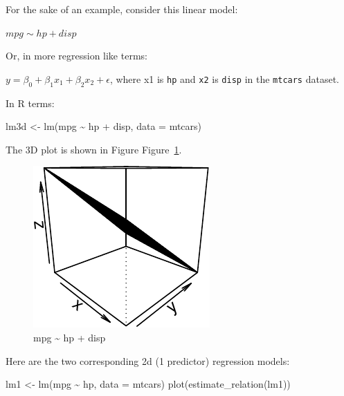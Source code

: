 \documentclass[
  letterpaper,
  DIV=11,
  numbers=noendperiod]{scrreprt}
\newenvironment{Shaded}{\begin{snugshade}}{\end{snugshade}}
\newcommand{\AttributeTok}[1]{\textcolor[rgb]{0.40,0.45,0.13}{#1}}
\newcommand{\FunctionTok}[1]{\textcolor[rgb]{0.28,0.35,0.67}{#1}}
\newcommand{\NormalTok}[1]{\textcolor[rgb]{0.00,0.23,0.31}{#1}}
\newcommand{\OtherTok}[1]{\textcolor[rgb]{0.00,0.23,0.31}{#1}}
\newcommand{\SpecialCharTok}[1]{\textcolor[rgb]{0.37,0.37,0.37}{#1}}
\theoremstyle{definition}
\theoremstyle{definition}
\theoremstyle{remark}
\begin{document}
For the sake of an example, consider this linear model:

\(mpg \sim hp + disp\)

Or, in more regression like terms:

\(y = \beta_0 + \beta_1 x_1 + \beta_2 x_2 + \epsilon\), where x1 is
\texttt{hp} and \texttt{x2} is \texttt{disp} in the \texttt{mtcars}
dataset.

In R terms:

\begin{Shaded}
\begin{Highlighting}[]
\NormalTok{lm3d }\OtherTok{\textless{}{-}} \FunctionTok{lm}\NormalTok{(mpg }\SpecialCharTok{\textasciitilde{}}\NormalTok{ hp }\SpecialCharTok{+}\NormalTok{ disp, }\AttributeTok{data =}\NormalTok{ mtcars)}
\end{Highlighting}
\end{Shaded}

The 3D plot is shown in Figure Figure~\ref{fig-mtcars3d}.

\begin{figure}

{\centering \includegraphics{./regression2_files/figure-pdf/fig-mtcars3d-1.pdf}

}

\caption{\label{fig-mtcars3d}mpg \textasciitilde{} hp + disp}

\end{figure}

Here are the two corresponding 2d (1 predictor) regression models:

\begin{Shaded}
\begin{Highlighting}[]
\NormalTok{lm1 }\OtherTok{\textless{}{-}} \FunctionTok{lm}\NormalTok{(mpg }\SpecialCharTok{\textasciitilde{}}\NormalTok{ hp, }\AttributeTok{data =}\NormalTok{ mtcars)}
\FunctionTok{plot}\NormalTok{(}\FunctionTok{estimate\_relation}\NormalTok{(lm1))}
\end{Highlighting}
\end{Shaded}
\end{document}
